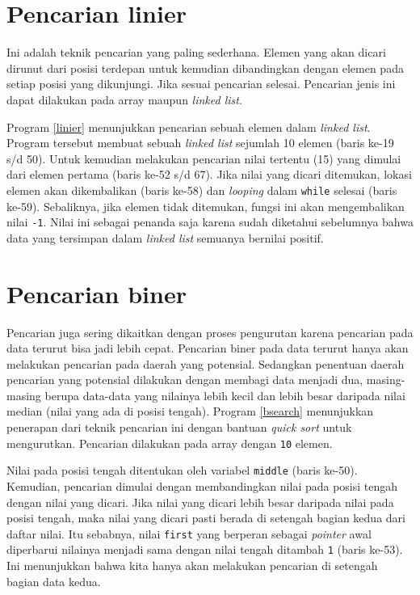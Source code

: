 \section{Pencarian linier}
Ini adalah teknik pencarian yang paling sederhana. Elemen yang akan dicari dirunut dari posisi terdepan untuk kemudian dibandingkan dengan elemen pada setiap posisi yang dikunjungi. Jika sesuai pencarian selesai. Pencarian jenis ini dapat dilakukan pada array maupun \textit{linked list}. 

Program \ref{linier} menunjukkan pencarian sebuah elemen dalam \textit{linked list}. Program tersebut membuat sebuah \textit{linked list} sejumlah 10 elemen (baris ke-19 s/d 50). Untuk kemudian melakukan pencarian nilai tertentu (15) yang dimulai dari elemen pertama (baris ke-52 s/d 67). Jika nilai yang dicari ditemukan, lokasi elemen akan dikembalikan (baris ke-58) dan \textit{looping} dalam \texttt{while} selesai (baris ke-59). Sebaliknya, jika elemen tidak ditemukan, fungsi ini akan mengembalikan nilai \texttt{-1}. Nilai ini sebagai penanda saja karena sudah diketahui sebelumnya bahwa data yang tersimpan dalam \textit{linked list} semuanya bernilai positif.

\scriptsize

\normalsize

\section{Pencarian biner}
Pencarian juga sering dikaitkan dengan proses pengurutan karena pencarian pada data terurut bisa jadi lebih cepat. Pencarian biner pada data terurut hanya akan melakukan pencarian pada daerah yang potensial. Sedangkan penentuan daerah pencarian yang potensial dilakukan dengan membagi data menjadi dua, masing-masing berupa data-data yang nilainya lebih kecil dan lebih besar daripada nilai median (nilai yang ada di posisi tengah). Program \ref{bsearch} menunjukkan penerapan dari teknik pencarian ini dengan bantuan \textit{quick sort} untuk mengurutkan. Pencarian dilakukan pada array dengan \texttt{10} elemen.

Nilai pada posisi tengah ditentukan oleh variabel \texttt{middle} (baris ke-50). Kemudian, pencarian dimulai dengan membandingkan nilai pada posisi tengah dengan nilai yang dicari. Jika nilai yang dicari lebih besar daripada nilai pada posisi tengah, maka nilai yang dicari pasti berada di setengah bagian kedua dari daftar nilai. Itu sebabnya, nilai \texttt{first} yang berperan sebagai \textit{pointer} awal diperbarui nilainya menjadi sama dengan nilai tengah ditambah \texttt{1} (baris ke-53). Ini menunjukkan bahwa kita hanya akan melakukan pencarian di setengah bagian data kedua.

